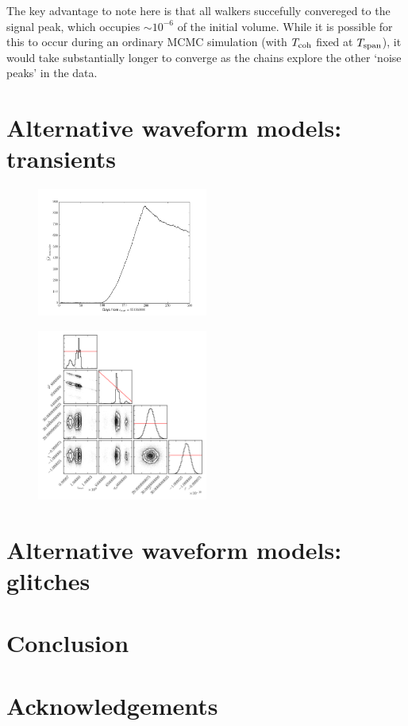 \documentclass[aps, prd, twocolumn, superscriptaddress, floatfix, showpacs, nofootinbib, longbibliography]{revtex4-1}
\begin{document}
The key advantage to note here is that all walkers succefully convereged to the
signal peak, which occupies $\sim 10^{-6}$ of the initial volume. While it is
possible for this to occur during an ordinary MCMC simulation (with $T_{\rm coh}$
fixed at $T_{\rm span}$), it would take substantially longer to converge as the
chains explore the other `noise peaks' in the data.

\section{Alternative waveform models: transients}
\label{sec_transients}

\begin{figure}[htb]
\centering
\includegraphics[width=0.5\textwidth]{transient_search_initial_stage_twoFcumulative}
\caption{}
\label{fig:}
\end{figure}

\begin{figure}[htb]
\centering
\includegraphics[width=0.5\textwidth]{transient_search_corner}
\caption{}
\label{fig:}
\end{figure}

\section{Alternative waveform models: glitches}
\label{sec_glitches}

\section{Conclusion}
\label{sec_conclusion}



\section{Acknowledgements}


\end{document}
